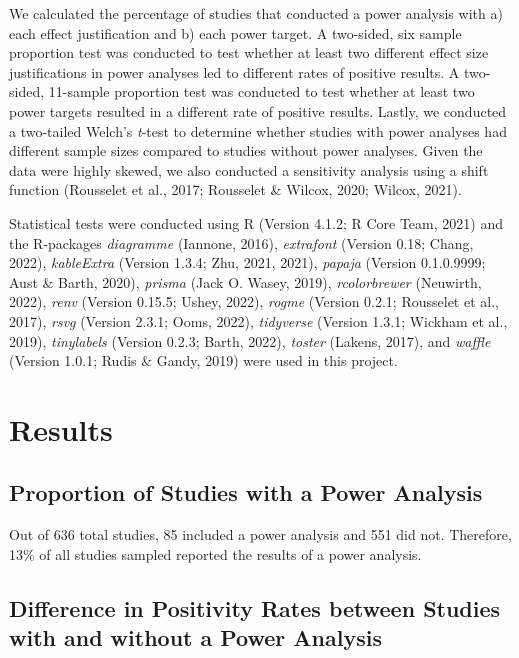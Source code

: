 \documentclass[
  doc, donotrepeattitle,floatsintext]{apa7}
\begin{document}
We calculated the percentage of studies that conducted a power analysis with a) each effect justification and b) each power target. A two-sided, six sample proportion test was conducted to test whether at least two different effect size justifications in power analyses led to different rates of positive results. A two-sided, 11-sample proportion test was conducted to test whether at least two power targets resulted in a different rate of positive results. Lastly, we conducted a two-tailed Welch's \emph{t}-test to determine whether studies with power analyses had different sample sizes compared to studies without power analyses. Given the data were highly skewed, we also conducted a sensitivity analysis using a shift function (Rousselet et al., 2017; Rousselet \& Wilcox, 2020; Wilcox, 2021).

Statistical tests were conducted using R (Version 4.1.2; R Core Team, 2021) and the R-packages \emph{diagramme} (Iannone, 2016), \emph{extrafont} (Version 0.18; Chang, 2022), \emph{kableExtra} (Version 1.3.4; Zhu, 2021, 2021), \emph{papaja} (Version 0.1.0.9999; Aust \& Barth, 2020), \emph{prisma} (Jack O. Wasey, 2019), \emph{rcolorbrewer} (Neuwirth, 2022), \emph{renv} (Version 0.15.5; Ushey, 2022), \emph{rogme} (Version 0.2.1; Rousselet et al., 2017), \emph{rsvg} (Version 2.3.1; Ooms, 2022), \emph{tidyverse} (Version 1.3.1; Wickham et al., 2019), \emph{tinylabels} (Version 0.2.3; Barth, 2022), \emph{toster} (Lakens, 2017), and \emph{waffle} (Version 1.0.1; Rudis \& Gandy, 2019) were used in this project.

\hypertarget{results}{%
\section{Results}\label{results}}

\hypertarget{proportion-of-studies-with-a-power-analysis}{%
\subsection{Proportion of Studies with a Power Analysis}\label{proportion-of-studies-with-a-power-analysis}}

Out of 636 total studies, 85 included a power analysis and 551 did not. Therefore, 13\% of all studies sampled reported the results of a power analysis.

\hypertarget{difference-in-positivity-rates-between-studies-with-and-without-a-power-analysis}{%
\subsection{Difference in Positivity Rates between Studies with and without a Power Analysis}\label{difference-in-positivity-rates-between-studies-with-and-without-a-power-analysis}}
\end{document}

